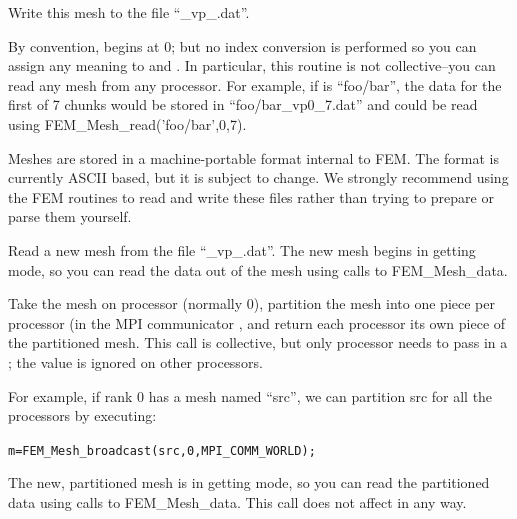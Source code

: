 Write this mesh to the file ``\_vp\_.dat''.

By convention,  begins at 0; but no index conversion is
performed so you can assign any meaning to  and .
In particular, this routine is not collective--you can read any
mesh from any processor.
For example, if  is ``foo/bar'', the data for the 
first of 7 chunks would be stored in ``foo/bar\_vp0\_7.dat''
and could be read using FEM\_Mesh\_read('foo/bar',0,7).

Meshes are stored in a machine-portable format internal to FEM.
The format is currently ASCII based, but it is subject to change.
We strongly recommend using the FEM routines to read and write 
these files rather than trying to prepare or parse them yourself.



Read a new mesh from the file ``\_vp\_.dat''.
The new mesh begins in getting mode, so you can read the 
data out of the mesh using calls to FEM\_Mesh\_data.




Take the mesh  on processor  (normally 0), 
partition the mesh into one piece per processor (in the MPI communicator
, and return each processor its own piece 
of the partitioned mesh.  This call is collective, but only 
processor  needs to pass in a ; the 
 value is ignored on other processors.

For example, if rank 0 has a mesh named ``src'', we can 
partition src for all the processors by executing:
\begin{alltt}
  m=FEM_Mesh_broadcast(src,0,MPI_COMM_WORLD);
\end{alltt}

The new, partitioned mesh is in getting mode, so 
you can read the partitioned data using calls to FEM\_Mesh\_data.
This call does not affect  in any way.


